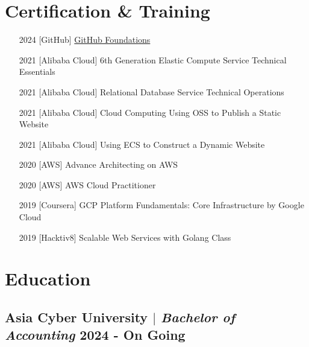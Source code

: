 \documentclass[11pt]{article}
\begin{document}
\section{Certification \& Training}
\begin{enumerate}[itemsep=0pt]
    \item [2024] [GitHub] \href{https://www.credly.com/badges/e7f6e3ea-cd4b-4b30-b5df-9099d23649c9/public_url}{GitHub Foundations} 
    \item [2021] [Alibaba Cloud] 6th Generation Elastic Compute Service Technical Essentials
    \item [2021] [Alibaba Cloud] Relational Database Service Technical Operations
    \item [2021] [Alibaba Cloud] Cloud Computing Using OSS to Publish a Static Website
    \item [2021] [Alibaba Cloud] Using ECS to Construct a Dynamic Website
    \item [2020] [AWS] Advance Architecting on AWS
    \item [2020] [AWS] AWS Cloud Practitioner
    \item [2019] [Coursera] GCP Platform Fundamentals: Core Infrastructure by Google Cloud
    \item [2019] [Hacktiv8] Scalable Web Services with Golang Class
\end{enumerate}

\section{Education}
\vspace{0.5\baselineskip}

\subsection{Asia Cyber University $|$ {\normalfont\textit{Bachelor of Accounting}} \hfill 2024 - On Going}
\vspace{0.5\baselineskip}
\end{document}
